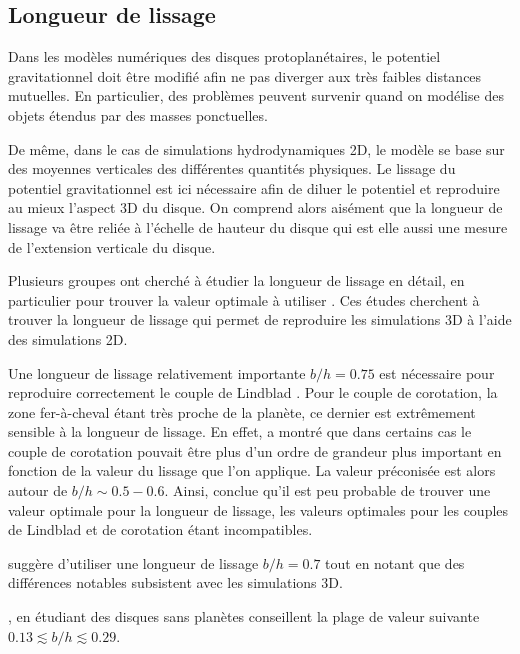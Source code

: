 
\subsection{Longueur de lissage}
Dans les modèles numériques des disques protoplanétaires, le potentiel gravitationnel doit être modifié afin ne pas diverger aux très faibles distances mutuelles. En particulier, des problèmes peuvent survenir quand on modélise des objets étendus par des masses ponctuelles. 

De même, dans le cas de simulations hydrodynamiques 2D, le modèle se base sur des moyennes verticales des différentes quantités physiques. Le lissage du potentiel gravitationnel est ici nécessaire afin de diluer le potentiel et reproduire au mieux l'aspect 3D du disque. On comprend alors aisément que la longueur de lissage va être reliée à l'échelle de hauteur du disque qui est elle aussi une mesure de l'extension verticale du disque. 

Plusieurs groupes ont cherché à étudier la longueur de lissage en détail, en particulier pour trouver la valeur optimale à utiliser \citep{hure2009local, muller2012treating}. Ces études cherchent à trouver la longueur de lissage qui permet de reproduire les simulations 3D à l'aide des simulations 2D. 

Une longueur de lissage relativement importante $b/h = 0.75$ est nécessaire pour reproduire correctement le couple de Lindblad \citep{masset2002coorbital}. Pour le couple de corotation, la zone fer-à-cheval étant très proche de la planète, ce dernier est extrêmement sensible à la longueur de lissage. En effet, \cite{masset2002coorbital} a montré que dans certains cas le couple de corotation pouvait être plus d'un ordre de grandeur plus important en fonction de la valeur du lissage que l'on applique. La valeur préconisée est alors autour de $b/h\sim 0.5-0.6$. Ainsi, \cite{masset2002coorbital} conclue qu'il est peu probable de trouver une valeur optimale pour la longueur de lissage, les valeurs optimales pour les couples de Lindblad et de corotation étant incompatibles. 

\cite{muller2012treating} suggère d'utiliser une longueur de lissage $b/h = 0.7$ tout en notant que des différences notables subsistent avec les simulations 3D. 

\cite{hure2009local}, en étudiant des disques sans planètes conseillent la plage de valeur suivante $0.13 \lesssim b/h \lesssim 0.29$.

\bigskip

